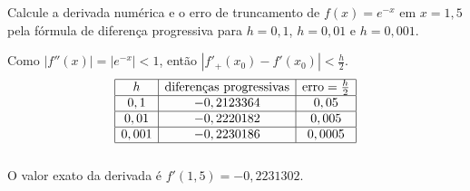 
\begin{ex}
Calcule a derivada numérica e o erro de truncamento de $f(x)=e^{-x}$ em $x=1,5$ pela fórmula de diferença progressiva para $h=0,1$, $h=0,01$ e $h=0,001$.
\end{ex}
\begin{sol}
Como $|f''(x)|=|e^{-x}|<1$, então $|f'_+(x_0)-f'(x_0)|<\frac{h}{2}$.
$$
\begin{array}{|c|c|c|}\hline
 h&\hbox{diferenças progressivas} & \hbox{erro}=\frac{h}{2}\\\hline
0,1&- 0,2123364 & 0,05\\\hline
0,01 &- 0,2220182 & 0,005\\\hline
0,001 &- 0,2230186 & 0,0005\\\hline
\multicolumn{3}{c}{}
\end{array}
$$
O valor exato da derivada é $f'(1,5)=-0,2231302$.
\end{sol}

